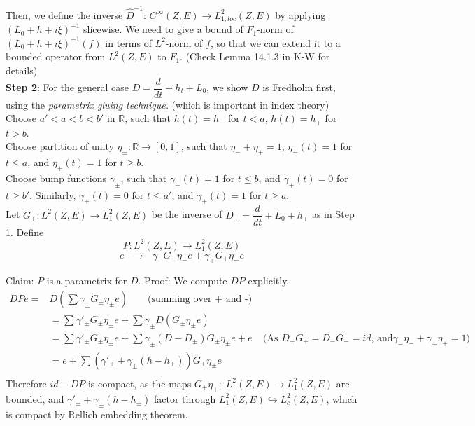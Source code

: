 		\vspace{5mm} Then, we define the inverse $\hat{D}^{-1}$: $C^{\infty}(Z,E) \rightarrow L^2_{1,loc}(Z,E)$ by applying $(L_0+h+i\xi)^{-1}$  slicewise. We need to give a bound of $F_1$-norm of $(L_0+h+i\xi)^{-1}(f)$ in terms of $L^2$-norm of $f$, so that we can extend it to a bounded operator from $L^2(Z,E) $ to $F_1$. (Check Lemma 14.1.3 in K-W for details) \\ 
		
		\vspace{5mm}
		\textbf{Step 2}: For the general case $D=\dfrac{d}{dt}+h_t+L_0$, we show $D$ is Fredholm first, using the \textit{parametrix gluing technique.} (which is important in index theory)\\
		\vspace{2mm}
	    Choose $a'<a<b<b' $ in $\mathbb{R}$, such that $h(t)=h_-$ for $t<a$, $h(t) = h_+ $  for $t >b$.\\
	    \vspace{2mm}
	    Choose partition of unity $\eta_{\pm} :\mathbb{R} \rightarrow [0,1] $, such that $\eta_-+\eta_+=1$,  $ \eta_-(t) =1$ for $t \leq a$, and $\eta_+(t) = 1$ for $t\geq b $. \\
	    \vspace{2mm}
	    Choose bump functions $\gamma_{\pm}$, such that $\gamma_-(t) = 1 $ for $t \leq b$, and $\gamma_+(t) =0$ for $t \geq b'$. Similarly, $\gamma_+(t)  = 0 $ for $t\leq a'$, and $\gamma_+(t) =1$ for $t \geq a$. \\
	    \newpage
		Let $G_{\pm}: L^2(Z,E) \rightarrow L^2_1(Z,E)$ be the inverse of $D_{\pm}= \dfrac{d}{dt} +L_0+h_{\pm}$ as in Step 1. Define \[P : L^2(Z,E) \rightarrow L^2_1(Z,E) \]\[
		e \text { }\rightarrow \text{ } \gamma_-G_-\eta_-e + \gamma_+G_+\eta_+e\]
		
		Claim: $P$ is a parametrix for $D$.
		Proof: We compute $DP$ explicitly. 
		\begin{align*}
		    DPe = & D(\sum \gamma_{\pm}G_{\pm}\eta_{\pm}e)\; \; \; \; \; \;  \text{       (summing over + and -)} \\
		    & = \sum \gamma'_{\pm}G_{\pm}\eta_{\pm}e + \sum \gamma_{\pm}D(G_{\pm}\eta_{\pm}e) \\
		    & = \sum \gamma'_{\pm}G_{\pm}\eta_{\pm}e +  \sum \gamma_{\pm}(D-D_{\pm})G_{\pm}\eta_{\pm}e + e \;  \; \; \; \text{(As } D_+G_+ = D_-G_- = id\text {, and} \gamma_-\eta_-+\gamma_+\eta_+ =1 )\\
		    & = e + \sum (\gamma'_{\pm}+ \gamma_{\pm}(h-h_{\pm}))G_{\pm}\eta_{\pm}e\\
		\end{align*}
		Therefore $id-DP$ is compact, as the maps $G_{\pm}\eta_{\pm} : \; L^2(Z,E) \rightarrow L^2_1(Z,E) $ are bounded, and $\gamma'_{\pm}+ \gamma_{\pm}(h-h_{\pm})$ factor through $L^2_1(Z,E) \hookrightarrow L^2_c(Z,E)$, which is compact by Rellich embedding theorem.\\
		\vspace{5mm}
		
